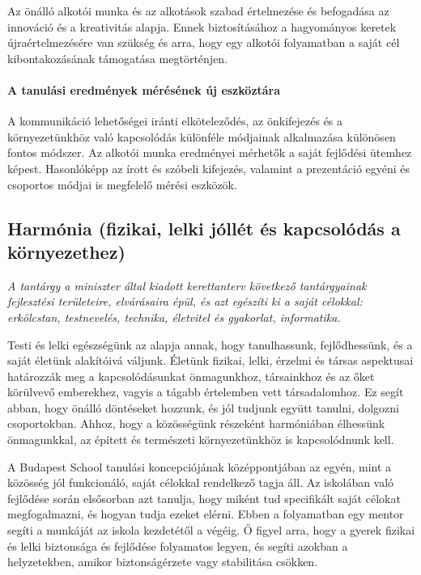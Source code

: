 Az önálló alkotói munka és az alkotások szabad értelmezése és befogadása az
innováció és a kreativitás alapja. Ennek biztosításához a hagyományos keretek
újraértelmezésére van szükség és arra, hogy egy alkotói folyamatban a saját cél
kibontakozásának támogatása megtörténjen.

\paragraph{A tanulási eredmények mérésének új eszköztára}

A kommunikáció lehetőségei iránti elköteleződés, az önkifejezés és a
környezetünkhöz való kapcsolódás különféle módjainak alkalmazása különösen
fontos módszer. Az alkotói munka eredményei mérhetők a saját fejlődési ütemhez
képest. Hasonlóképp az írott és szóbeli kifejezés, valamint a prezentáció
egyéni és csoportos módjai is megfelelő mérési eszközök.

\subsection[Harmónia]{Harmónia (fizikai, lelki jóllét és kapcsolódás a
  környezethez)}
\emph{A tantárgy a miniszter által kiadott kerettanterv következő tantárgyainak
  fejlesztési területeire, elvárásaira épül, és azt egészíti ki a saját célokkal: erkölcstan, testnevelés, technika,
  életvitel és gyakorlat, informatika.}

Testi és lelki egészségünk az alapja annak, hogy tanulhassunk, fejlődhessünk,
és a saját életünk alakítóivá váljunk. Életünk fizikai, lelki, érzelmi és
társas aspektusai határozzák meg a kapcsolódásunkat önmagunkhoz, társainkhoz és
az őket körülvevő emberekhez, vagyis a tágabb értelemben vett társadalomhoz. Ez
segít abban, hogy önálló döntéseket hozzunk, és jól tudjunk együtt tanulni,
dolgozni csoportokban. Ahhoz, hogy a közösségünk részeként harmóniában
élhessünk önmagunkkal, az épített és természeti környezetünkhöz is
kapcsolódnunk kell.

A Budapest School tanulási koncepciójának középpontjában az egyén, mint a
közösség jól funkcionáló, saját célokkal rendelkező tagja áll. Az iskolában
való fejlődése során elsősorban azt tanulja, hogy miként tud specifikált saját
célokat megfogalmazni, és hogyan tudja ezeket elérni. Ebben a folyamatban egy
mentor segíti a munkáját az iskola kezdetétől a végéig. Ő figyel arra, hogy a
gyerek fizikai és lelki biztonsága és fejlődése folyamatos legyen, és segíti
azokban a helyzetekben, amikor biztonságérzete vagy stabilitása csökken.

